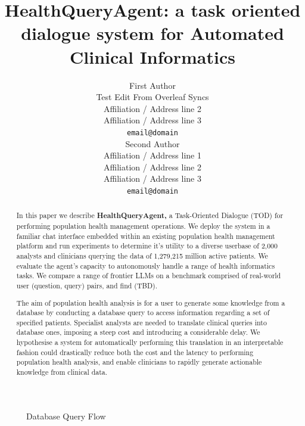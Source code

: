 \documentclass[11pt]{article}
\title{HealthQueryAgent: a task oriented dialogue system for Automated Clinical Informatics}
\author{First Author \\
  Test Edit From Overleaf Syncs \\
  Affiliation / Address line 2 \\
  Affiliation / Address line 3 \\
  \texttt{email@domain} \\\And
  Second Author \\
  Affiliation / Address line 1 \\
  Affiliation / Address line 2 \\
  Affiliation / Address line 3 \\
  \texttt{email@domain} \\}
\begin{document}
\maketitle
\begin{abstract}
In this paper we describe \textbf{HealthQueryAgent,} a Task-Oriented Dialogue (TOD) for performing population health management operations. We deploy the system in a familiar chat interface embedded within an existing population health management platform and run experiments to determine it's utility to a diverse userbase of 2,000 analysts and clinicians querying the data of 1,279,215 million active patients. We evaluate the agent's capacity to autonomously handle a range of health informatics tasks. We compare a range of frontier LLMs on a benchmark comprised of real-world user (question, query) pairs, and find (TBD). %

The aim of population health analysis is for a user to generate some knowledge from a database by conducting a database query to access information regarding a set of specified patients. 
Specialist analysts are needed to translate clinical queries into database ones, imposing a steep cost and introducing a considerable delay. We hypothesise a system for automatically performing this translation in an interpretable fashion could drastically reduce both the cost and the latency to performing population health analysis, and enable clinicians to rapidly generate actionable knowledge from clinical data.

\end{abstract}

\begin{figure}[htbp]
\centering

\caption{Database Query Flow}
\label{fig:query-flow}
\end{figure}
\end{document}
